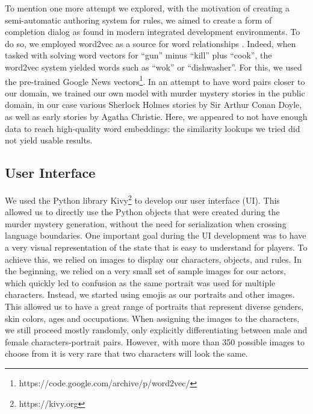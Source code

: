 To mention one more attempt we explored, with the motivation of creating a semi-automatic authoring system for rules, we aimed to create a form of completion dialog as found in modern integrated development environments.
To do so, we employed word2vec as a source for word relationships \cite{Mikolov2013EfficientEO}.
Indeed, when tasked with solving word vectors for \enquote{gun} minus \enquote{kill} plus \enquote{cook}, the word2vec system yielded words such as \enquote{wok} or \enquote{dishwasher}.
For this, we used the pre-trained Google News vectors\footnote{https://code.google.com/archive/p/word2vec/}.
In an attempt to have word pairs closer to our domain, we trained our own model with murder mystery stories in the public domain, in our case various Sherlock Holmes stories by Sir Arthur Conan Doyle, as well as early stories by Agatha Christie. Here, we appeared to not have enough data to reach high-quality word embeddings: the similarity lookups we tried did not yield usable results.

\subsection{User Interface} \label{user_interface}

We used the Python library Kivy\footnote{https://kivy.org} to develop our user interface (UI).
This allowed us to directly use the Python objects that were created during the murder mystery generation, without the need for serialization when crossing language boundaries.
One important goal during the UI development was to have a very visual representation of the state that is easy to understand for players.
To achieve this, we relied on images to display our characters, objects, and rules.
In the beginning, we relied on a very small set of sample images for our actors, which quickly led to confusion as the same portrait was used for multiple characters.
Instead, we started using emojis as our portraits and other images.
This allowed us to have a great range of portraits that represent diverse genders, skin colors, ages and occupations.
When assigning the images to the characters, we still proceed mostly randomly, only explicitly differentiating between male and female characters-portrait pairs.
However, with more than 350 possible images to choose from it is very rare that two characters will look the same.

